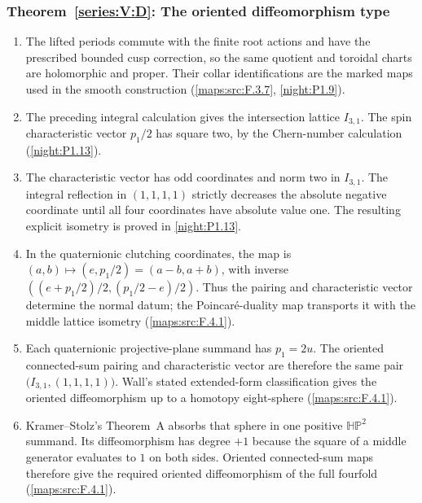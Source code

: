 \documentclass[11pt,a4paper]{article}
\numberwithin{equation}{section}
\theoremstyle{definition}
\begin{document}
\subsubsection*{Theorem~\ref{series:V:D}: The oriented diffeomorphism type}
\begin{enumerate}[label=\arabic*.,leftmargin=*]
\item\hypertarget{step-V-D-1}{} The lifted periods commute with the finite root actions and
  have the prescribed bounded cusp correction, so the same quotient
  and toroidal charts are holomorphic and proper.  Their collar
  identifications are the marked maps used in the smooth construction
  (\cref{maps:src:F.3.7}, \cref{night:P1.9}).

\item\hypertarget{step-V-D-2}{} The preceding integral calculation gives the intersection
  lattice $I_{3,1}$.  The spin characteristic vector $p_1/2$ has
  square two, by the Chern-number calculation
  (\cref{night:P1.13}).

\item\hypertarget{step-V-D-3}{} The characteristic vector has odd coordinates and norm two in $I_{3,1}$. The integral reflection in $(1,1,1,1)$ strictly decreases the absolute negative coordinate until all four coordinates have absolute value one. The resulting explicit isometry is proved in \cref{night:P1.13}.

\item\hypertarget{step-V-D-4}{} In the quaternionic clutching coordinates, the map is
  $(a,b)\mapsto(e,p_1/2)=(a-b,a+b)$, with inverse
  $((e+p_1/2)/2,(p_1/2-e)/2)$.  Thus the pairing and characteristic
  vector determine the normal datum; the Poincar\'e-duality map
  transports it with the middle lattice isometry
  (\cref{maps:src:F.4.1}).

\item\hypertarget{step-V-D-5}{} Each quaternionic projective-plane summand has $p_1=2u$.
  The oriented connected-sum pairing and characteristic vector are
  therefore the same pair $\bigl(I_{3,1},(1,1,1,1)\bigr)$.
  Wall's stated extended-form classification gives the oriented
  diffeomorphism up to a homotopy eight-sphere
  (\cref{maps:src:F.4.1}).

\item\hypertarget{step-V-D-6}{} Kramer--Stolz's Theorem~A absorbs that sphere in one positive
  $\mathbb{HP}^2$ summand.  Its diffeomorphism has degree $+1$ because
  the square of a middle generator evaluates to $1$ on both sides.
  Oriented connected-sum maps therefore give the required oriented
  diffeomorphism of the full fourfold
  (\cref{maps:src:F.4.1}).

\end{enumerate}
\end{document}
